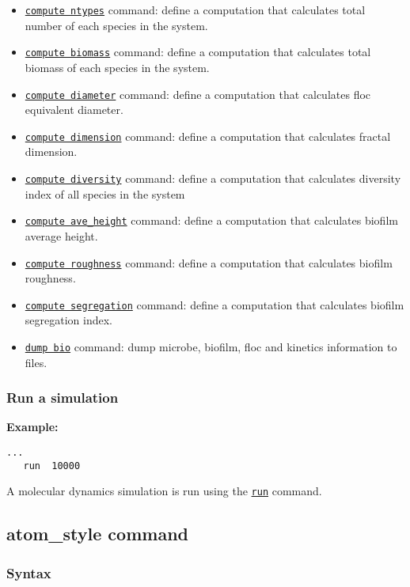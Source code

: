 \documentclass[11pt,a4paper,openright]{article}
\begin{document}
\begin{itemize} [nosep]
    \item \hyperref[cntypes]{\tt compute ntypes} command: define a computation that calculates total number of each species in the system.
    \item \hyperref[cbiomass]{\tt compute biomass} command:  define a computation that calculates total biomass of each species in the system.
    \item \hyperref[cdiameter]{\tt compute diameter} command: define a computation that calculates floc equivalent diameter.
    \item \hyperref[cdimension]{\tt compute dimension} command: define a computation that calculates fractal dimension.
    \item \hyperref[cdiversity]{\tt compute diversity} command: define a computation that calculates diversity index of all species in the system
    \item \hyperref[caveheight]{\tt compute ave\_height} command: define a computation that calculates biofilm average height.
    \item \hyperref[croughness]{\tt compute roughness} command: define a computation that calculates biofilm roughness.    
    \item \hyperref[csegregation]{\tt compute segregation} command: define a computation that calculates biofilm segregation index.
    \item \hyperref[dumpbio]{\tt dump bio} command: dump microbe, biofilm, floc and kinetics information to files. 
\end{itemize} 

\subsubsection{Run a simulation}
\textbf{Example:}
\begin{Verbatim}[frame=single]
   ...
   run  10000
\end{Verbatim}

A molecular dynamics simulation is run using the 
\href{http://lammps.sandia.gov/doc/run.html}{\tt run}
 command. 

\subsection{atom\_style command}
\label{atomstyle}
\subsubsection*{Syntax}
\end{document}
